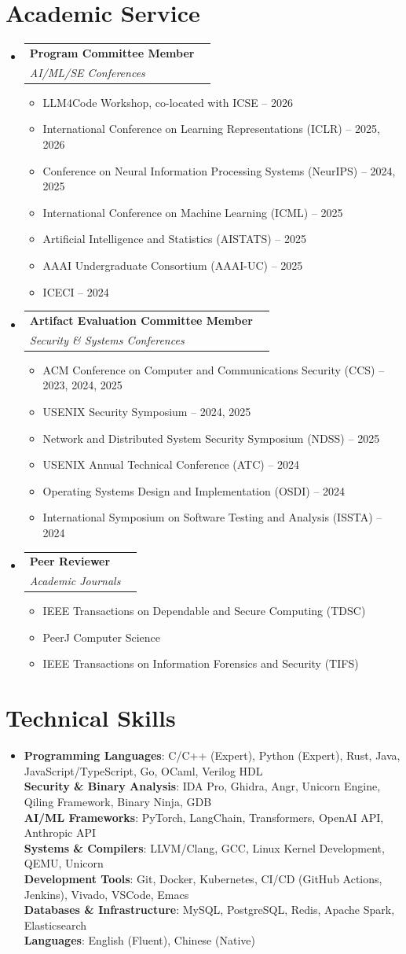 \documentclass[letterpaper,11pt]{article}
\makeatletter
\newcommand{\resumeItem}[1]{
  \item\small{
    {#1 \vspace{-2pt}}
  }
}
\newcommand{\resumeSubheading}[4]{
  \item
    \begin{tabular*}{0.97\textwidth}[t]{l@{\extracolsep{\fill}}r}
      \textbf{#1} & #2 \\
      \textit{\small#3} & \textit{\small #4} \\
    \end{tabular*}\vspace{-4pt}
}
\newcommand{\resumeSubHeadingListStart}{\begin{itemize}[leftmargin=0.15in, label={}]}
\newcommand{\resumeSubHeadingListEnd}{\end{itemize}}
\newcommand{\resumeItemListStart}{\begin{itemize}}
\newcommand{\resumeItemListEnd}{\end{itemize}\vspace{-5pt}}
\makeatother
\begin{document}
\section{Academic Service}
\resumeSubHeadingListStart
  \resumeSubheading
    {Program Committee Member}{}
    {AI/ML/SE Conferences}{}
    \resumeItemListStart
        \resumeItem{LLM4Code Workshop, co-located with ICSE -- 2026}
        \resumeItem{International Conference on Learning Representations (ICLR) -- 2025, 2026}
        \resumeItem{Conference on Neural Information Processing Systems (NeurIPS) -- 2024, 2025}
        \resumeItem{International Conference on Machine Learning (ICML) -- 2025}
        \resumeItem{Artificial Intelligence and Statistics (AISTATS) -- 2025}
        \resumeItem{AAAI Undergraduate Consortium (AAAI-UC) -- 2025}
        \resumeItem{ICECI -- 2024}
    \resumeItemListEnd
  \resumeSubheading
    {Artifact Evaluation Committee Member}{}
    {Security \& Systems Conferences}{}
    \resumeItemListStart
        \resumeItem{ACM Conference on Computer and Communications Security (CCS) -- 2023, 2024, 2025}
        \resumeItem{USENIX Security Symposium -- 2024, 2025}
        \resumeItem{Network and Distributed System Security Symposium (NDSS) -- 2025}
        \resumeItem{USENIX Annual Technical Conference (ATC) -- 2024}
        \resumeItem{Operating Systems Design and Implementation (OSDI) -- 2024}
        \resumeItem{International Symposium on Software Testing and Analysis (ISSTA) -- 2024}
    \resumeItemListEnd
  \resumeSubheading
    {Peer Reviewer}{}
    {Academic Journals}{}
    \resumeItemListStart
        \resumeItem{IEEE Transactions on Dependable and Secure Computing (TDSC)}
        \resumeItem{PeerJ Computer Science}
        \resumeItem{IEEE Transactions on Information Forensics and Security (TIFS)}
    \resumeItemListEnd
  \resumeSubHeadingListEnd


\section{Technical Skills}
    \begin{itemize}[leftmargin=0.15in, label={}]
    \item{
        \textbf{Programming Languages}{: C/C++ (Expert), Python (Expert), Rust, Java, JavaScript/TypeScript, Go, OCaml, Verilog HDL} \\
        \textbf{Security \& Binary Analysis}{: IDA Pro, Ghidra, Angr, Unicorn Engine, Qiling Framework, Binary Ninja, GDB} \\
        \textbf{AI/ML Frameworks}{: PyTorch, LangChain, Transformers, OpenAI API, Anthropic API} \\
        \textbf{Systems \& Compilers}{: LLVM/Clang, GCC, Linux Kernel Development, QEMU, Unicorn} \\
        \textbf{Development Tools}{: Git, Docker, Kubernetes, CI/CD (GitHub Actions, Jenkins), Vivado, VSCode, Emacs} \\
        \textbf{Databases \& Infrastructure}{: MySQL, PostgreSQL, Redis, Apache Spark, Elasticsearch} \\
        \textbf{Languages}{: English (Fluent), Chinese (Native)}
    }
    \end{itemize}


\end{document}
